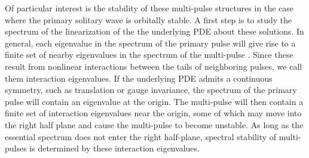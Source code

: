 \documentclass[12pt]{elsarticle}
\begin{document}
Of particular interest is the stability of these multi-pulse structures in the case where the primary solitary wave is orbitally stable. A first step is to study the spectrum of the linearization of the the underlying PDE about these solutions. In general, each eigenvalue in the spectrum of the primary pulse will give rise to a finite set of nearby eigenvalues in the spectrum of the multi-pulse \cite{Alexander1990,Sandstede1998}. Since these result from nonlinear interactions between the tails of neighboring pulses, we call them interaction eigenvalues. If the underlying PDE admits a continuous symmetry, such as translation or gauge invariance, the spectrum of the primary pulse will contain an eigenvalue at the origin. The multi-pulse will then contain a finite set of interaction eigenvalues near the origin, some of which may move into the right half plane and cause the multi-pulse to become unstable. As long as the essential spectrum does not enter the right half-plane, spectral stability of multi-pulses is determined by these interaction eigenvalues.
\end{document}
